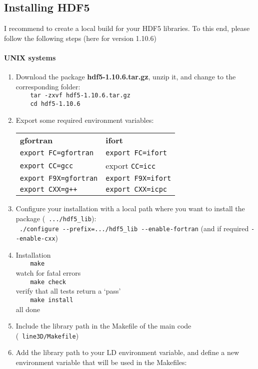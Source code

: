 \documentclass[10pt,a4paper]{article}
\begin{document}
\subsection{Installing HDF5}
\label{subsec:hdf5}
I recommend to create a local build for your HDF5 libraries. To this end, please follow the following steps (here for version 1.10.6)
\paragraph{UNIX systems}
\begin{enumerate}
\item Download the package \textbf{hdf5-1.10.6.tar.gz}, unzip it, and change to the corresponding folder: \\
  \verb|    tar -zxvf hdf5-1.10.6.tar.gz|\\
  \verb|    cd hdf5-1.10.6|
\item Export some required environment variables:\\
    \begin{tabular}{ll}
      \textbf{gfortran}  & \textbf{ifort} \\
      \verb|export FC=gfortran| & \verb|export FC=ifort| \\
      \verb|export CC=gcc| & export \verb|CC=icc| \\
      \verb|export F9X=gfortran| & \verb|export F9X=ifort| \\
      \verb|export CXX=g++| & \verb|export CXX=icpc|
    \end{tabular}
\item Configure your installation with a local path where you want to install the package (\eg~\verb|.../hdf5_lib|):\\
  \verb| ./configure --prefix=.../hdf5_lib --enable-fortran| (and if required \verb|--enable-cxx|)
\item Installation \\
  \verb|    make|\\ 
   watch for fatal errors\\
  \verb|    make check|\\
  verify that all tests return a `pass' \\
  \verb|    make install|\\
   all done
\item Include the library path in the Makefile of the main code (\eg~\verb|line3D/Makefile|)
\item Add the library path to your LD environment variable, and define a new environment variable that will be used in the Makefiles:\\

\end{enumerate}
\end{document}
